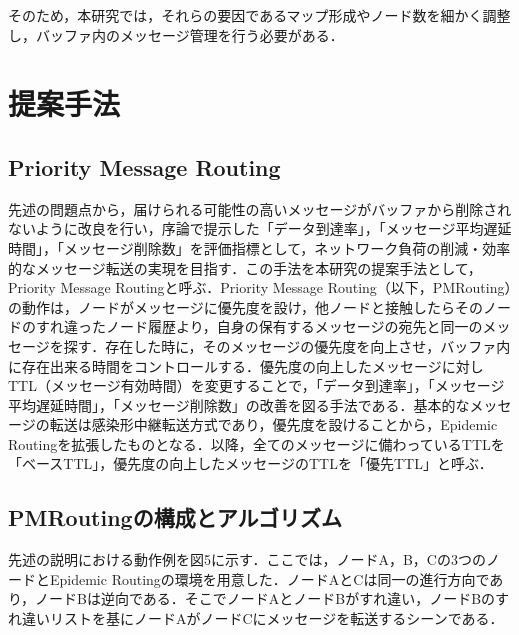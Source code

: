 \documentclass[11pt]{icsthesis}
\begin{document}
そのため，本研究では，それらの要因であるマップ形成やノード数を細かく調整し，バッファ内のメッセージ管理を行う必要がある．

\chapter{提案手法}
\section{Priority Message Routing}
先述の問題点から，届けられる可能性の高いメッセージがバッファから削除されないように改良を行い，序論で提示した「データ到達率」，「メッセージ平均遅延時間」，「メッセージ削除数」を評価指標として，ネットワーク負荷の削減・効率的なメッセージ転送の実現を目指す．この手法を本研究の提案手法として，Priority Message Routingと呼ぶ．Priority Message Routing（以下，PMRouting）の動作は，ノードがメッセージに優先度を設け，他ノードと接触したらそのノードのすれ違ったノード履歴より，自身の保有するメッセージの宛先と同一のメッセージを探す．存在した時に，そのメッセージの優先度を向上させ，バッファ内に存在出来る時間をコントロールする．優先度の向上したメッセージに対しTTL（メッセージ有効時間）を変更することで，「データ到達率」，「メッセージ平均遅延時間」，「メッセージ削除数」の改善を図る手法である．基本的なメッセージの転送は感染形中継転送方式であり，優先度を設けることから，Epidemic Routingを拡張したものとなる．以降，全てのメッセージに備わっているTTLを「ベースTTL」，優先度の向上したメッセージのTTLを「優先TTL」と呼ぶ．

\section{PMRoutingの構成とアルゴリズム}
先述の説明における動作例を図5に示す．ここでは，ノードA，B，Cの3つのノードとEpidemic Routingの環境を用意した．ノードAとCは同一の進行方向であり，ノードBは逆向である．そこでノードAとノードBがすれ違い，ノードBのすれ違いリストを基にノードAがノードCにメッセージを転送するシーンである．
\end{document}
